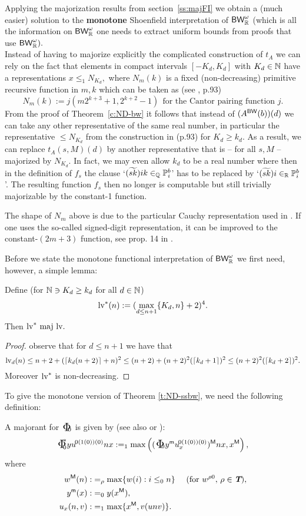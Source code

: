 Applying the majorization results from section~\ref{ss:majFI} we obtain a 
(much easier) solution to the {\bf monotone} Shoenfield interpretation 
of $\textsf{\upshape BW}^\omega_{\mathbb{R}}$ (which is all the information on $\textsf{\upshape BW}^\omega_{\mathbb{R}}$ 
one needs to extract uniform bounds from proofs that use $\textsf{\upshape BW}^\omega_{\mathbb{R}}).$ 
\\ Instead of having to majorize explicitly the complicated construction of 
$t_A$ we can rely on the fact that elements in 
compact intervals $[-K_d,K_d]$ with 
$K_d\in\mathbb{N}$ have a representations $x\le_1 N_{K_d},$ where $N_m(k)$ is a 
fixed (non-decreasing) primitive recursive function in 
$m,k$ which can be taken as 
(see \cite{Kohlenbach06}, p.93) 
\[ N_m(k):=j(m2^{k+3}+1,2^{k+2}-1) \ \ \mbox{for the Cantor 
pairing function $j.$} \] 
From the proof of Theorem~\ref{c:ND-bw} it follows that instead of 
$(A^{\textsf{\upshape BW}}(b))(d)$ we can take any other representative of the same 
real number, in particular the representative $\le N_{K_d}$ from 
the construction in \cite{Kohlenbach06}(p.93) for $K_d \ge k_d.$ As a 
result, we can replace $t_A(s,M)(d)$ by another representative 
that is -- for all $s,M$ --  
majorized by $N_{K_d}.$ In fact, we may even allow $k_d$ to be a real number 
where then in the definition of $f_s$ the clause `$(\widetilde{sk})ik
\in_{\mathbb{Q}} \mathbb{P}^b_i$' has to be replaced by `$(\widetilde{sk})i
\in_{\mathbb{R}} \mathbb{P}^b_i$'. The resulting function $f_s$ then no longer is computable 
but still trivially majorizable by the constant-1 function. \\ 
\begin{remark} The shape of $N_m$ above is due to the particular Cauchy representation 
used in \cite{Kohlenbach06}. If one uses the so-called signed-digit representation, it 
can be improved to the constant-$(2m+3)$ function, see prop. 14 in \cite{Engracia}.
\end{remark}
Before we state the monotone functional interpretation of $\textsf{\upshape BW}^\omega_{\mathbb{R}}$ 
we first need, however, a simple lemma: 
\begin{lemma} Define (for $\mathbb{N}\ni K_d\ge k_d$ for all $d\in\mathbb{N}$)
\[ \mathrm {lv}^*(n):=(\max\limits_{d\leq n+1} \{ K_d,n\}+2)^4. \]
Then $\mathrm {lv}^*\,\operatorname{maj}\, \mathrm {lv}.$
\end{lemma}
\begin{proof}
observe that for $d\leq n+1$ we have that
 \[\mathrm {lv}_d(n)\leq n+2+(\lceil k_d (n+2)\rceil+n)^2
 \leq (n+2)+(n+2)^2(\lceil k_d + 1\rceil)^2
 \leq (n+2)^2(\lceil k_d + 2\rceil)^2.\] Moreover $\mathrm {lv}^*$ is non-decreasing.
\end{proof}
To give the monotone version of Theorem \ref{t:ND-ssbw}, we need the 
following definition:
\begin{dfn} A majorant for $\bPhi_0$ is given by (see also 
\cite{Kohlenbach06} or \cite{Bezem85}):
\[\bPhi^*_0{y}u^{\!0(1(0))(0)}nx:=_1\max\left( 
(\bPhi_0{y^{\mon}}u_{x}^{\!0(1(0))(0)}){^\Mon} nx,x{^\Mon}\right),\]
where 
\begin{align*}
w{^{\textsf{\upshape M}}}(n):&=_\rho\max\{w(i):i\leq_0 n\}\quad \text{ 
(for $w^{\rho0}$, $\rho\in\emph{\protect\textbf{T}}$)}, \\
y{^{\textsf{\upshape m}}}(x):&=_0y(x{^{\textsf{\upshape M}}}), \\
u_x(n,v):&=_1\max\{x{^{\textsf{\upshape M}}},v(unv)\}.
\end{align*}
\end{dfn}

